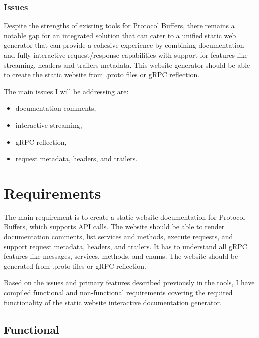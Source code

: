\subsubsection{Issues}
Despite the strengths of existing tools for Protocol Buffers, there remains a notable gap for an integrated solution that can cater to a unified static web generator that can provide a cohesive experience by combining documentation and fully interactive request/response capabilities with support for features like streaming, headers and trailers metadata.
This website generator should be able to create the static website from .proto files or gRPC reflection.

The main issues I will be addressing are:
\begin{itemize}
    \item documentation comments,
    \item interactive streaming,
    \item gRPC reflection,
    \item request metadata, headers, and trailers.
\end{itemize}


\section{Requirements}
The main requirement is to create a static website documentation for Protocol Buffers, which supports API calls.
The website should be able to render documentation comments, list services and methods, execute requests, and support request metadata, headers, and trailers.
It has to understand all gRPC features like messages, services, methods, and enums.
The website should be generated from .proto files or gRPC reflection.

Based on the issues and primary features described previously in the tools, I have compiled functional and non-functional requirements covering the required functionality of the static website interactive documentation generator.

\subsection{Functional}
\newcommand{\functional}[1]{%
    \stepcounter{fcounter}%
    \subsubsection{F\arabic{fcounter} -- #1}%
}

